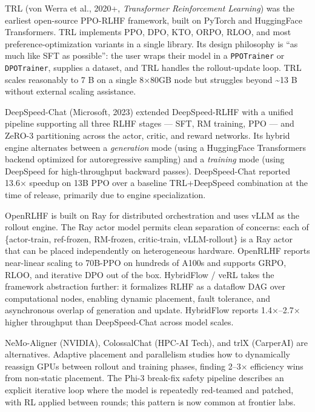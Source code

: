 \documentclass{article}
\begin{document}
TRL (von Werra et al., 2020+, \emph{Transformer Reinforcement Learning}) was the earliest open-source PPO-RLHF framework, built on PyTorch and HuggingFace Transformers. TRL implements PPO, DPO, KTO, ORPO, RLOO, and most preference-optimization variants in a single library. Its design philosophy is ``as much like SFT as possible'': the user wraps their model in a \texttt{PPOTrainer} or \texttt{DPOTrainer}, supplies a dataset, and TRL handles the rollout-update loop. TRL scales reasonably to 7 B on a single 8×80GB node but struggles beyond \textasciitilde13 B without external scaling assistance.

DeepSpeed-Chat (Microsoft, 2023) extended DeepSpeed-RLHF with a unified pipeline supporting all three RLHF stages --- SFT, RM training, PPO --- and ZeRO-3 partitioning across the actor, critic, and reward networks. Its hybrid engine alternates between a \emph{generation} mode (using a HuggingFace Transformers backend optimized for autoregressive sampling) and a \emph{training} mode (using DeepSpeed for high-throughput backward passes). DeepSpeed-Chat reported 13.6× speedup on 13B PPO over a baseline TRL+DeepSpeed combination at the time of release, primarily due to engine specialization.

OpenRLHF \citep{hu20252025} is built on Ray for distributed orchestration and uses vLLM as the rollout engine. The Ray actor model permits clean separation of concerns: each of \{actor-train, ref-frozen, RM-frozen, critic-train, vLLM-rollout\} is a Ray actor that can be placed independently on heterogeneous hardware. OpenRLHF reports near-linear scaling to 70B-PPO on hundreds of A100s and supports GRPO, RLOO, and iterative DPO out of the box. HybridFlow / veRL \citep{sheng20252024} takes the framework abstraction further: it formalizes RLHF as a dataflow DAG over computational nodes, enabling dynamic placement, fault tolerance, and asynchronous overlap of generation and update. HybridFlow reports 1.4×--2.7× higher throughput than DeepSpeed-Chat across model scales.

NeMo-Aligner (NVIDIA), ColossalChat (HPC-AI Tech), and trlX (CarperAI) are alternatives. Adaptive placement and parallelism \citep{xiao20232023} studies how to dynamically reassign GPUs between rollout and training phases, finding 2--3× efficiency wins from non-static placement. The Phi-3 break-fix safety pipeline \citep{haider20242024} describes an explicit iterative loop where the model is repeatedly red-teamed and patched, with RL applied between rounds; this pattern is now common at frontier labs.
\end{document}
